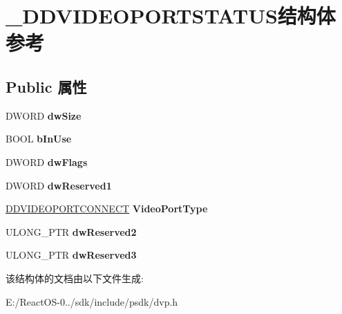 \hypertarget{struct___d_d_v_i_d_e_o_p_o_r_t_s_t_a_t_u_s}{}\section{\+\_\+\+D\+D\+V\+I\+D\+E\+O\+P\+O\+R\+T\+S\+T\+A\+T\+U\+S结构体 参考}
\label{struct___d_d_v_i_d_e_o_p_o_r_t_s_t_a_t_u_s}
\subsection*{Public 属性}
\begin{DoxyCompactItemize}
\item 
\mbox{\label{struct___d_d_v_i_d_e_o_p_o_r_t_s_t_a_t_u_s_abbeaa5eb3db5a30acf35aac8327762be}} 
D\+W\+O\+RD {\bfseries dw\+Size}
\item 
\mbox{\label{struct___d_d_v_i_d_e_o_p_o_r_t_s_t_a_t_u_s_a8d2874156f83cbec535e9f4b451b939e}} 
B\+O\+OL {\bfseries b\+In\+Use}
\item 
\mbox{\label{struct___d_d_v_i_d_e_o_p_o_r_t_s_t_a_t_u_s_a5bf6765398bd51988c1e55b16aaf6a8e}} 
D\+W\+O\+RD {\bfseries dw\+Flags}
\item 
\mbox{\label{struct___d_d_v_i_d_e_o_p_o_r_t_s_t_a_t_u_s_a45c3374d1866be8793b05aee9c899422}} 
D\+W\+O\+RD {\bfseries dw\+Reserved1}
\item 
\mbox{\label{struct___d_d_v_i_d_e_o_p_o_r_t_s_t_a_t_u_s_a04b8c693f5b156d2654f84532e41200d}} 
\hyperlink{struct___d_d_v_i_d_e_o_p_o_r_t_c_o_n_n_e_c_t}{D\+D\+V\+I\+D\+E\+O\+P\+O\+R\+T\+C\+O\+N\+N\+E\+CT} {\bfseries Video\+Port\+Type}
\item 
\mbox{\label{struct___d_d_v_i_d_e_o_p_o_r_t_s_t_a_t_u_s_a3a0d5f754778c0f10a12e760f888f97a}} 
U\+L\+O\+N\+G\+\_\+\+P\+TR {\bfseries dw\+Reserved2}
\item 
\mbox{\label{struct___d_d_v_i_d_e_o_p_o_r_t_s_t_a_t_u_s_aae8e5c582f3883959556b572c64fd0de}} 
U\+L\+O\+N\+G\+\_\+\+P\+TR {\bfseries dw\+Reserved3}
\end{DoxyCompactItemize}


该结构体的文档由以下文件生成\+:\begin{DoxyCompactItemize}
\item 
E\+:/\+React\+O\+S-\/0../sdk/include/psdk/dvp.\+h\end{DoxyCompactItemize}
